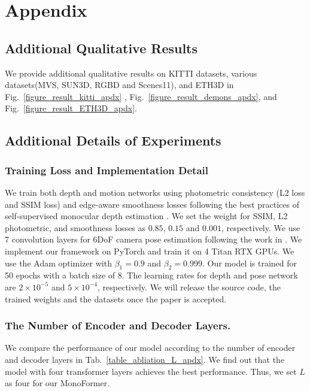 \documentclass[letterpaper]{article} \usepackage{aaai23}  \usepackage{times}  \usepackage{helvet}  \usepackage{courier}  \usepackage[hyphens]{url}  \usepackage{graphicx} \urlstyle{rm} \def\UrlFont{\rm}  \usepackage{natbib}  \usepackage{caption} \frenchspacing  \setlength{\pdfpagewidth}{8.5in} \setlength{\pdfpageheight}{11in} \usepackage{algorithm}
\newcommand{\tabref}[1]{Tab.~\ref{#1}}
\newcommand{\figref}[1]{Fig.~\ref{#1}}
\begin{document}
\appendix



\section{Appendix}

\subsection{Additional Qualitative Results}
We provide additional qualitative results on KITTI datasets, various datasets(MVS, SUN3D, RGBD and Scenes11), and ETH3D in \figref{figure_result_kitti_apdx}
, \figref{figure_result_demons_apdx}, and \figref{figure_result_ETH3D_apdx}.


\subsection{Additional Details of Experiments}

\subsubsection{Training Loss and Implementation Detail}
We train both depth and motion networks using photometric consistency (L2 loss and SSIM loss) and edge-aware smoothness losses following the best practices of self-supervised monocular depth estimation \cite{zhou2017unsupervised,godard2019digging,guizilini20203d}.
We set the weight for SSIM, L2 photometric, and smoothness losses as $0.85$, $0.15$ and $0.001$, respectively. 
We use 7 convolution layers for 6DoF camera pose estimation following the work in \cite{zhou2017unsupervised}.
We implement our framework on PyTorch and train it on 4 Titan RTX GPUs. We use the Adam optimizer \cite{kingma2014adam} with $\beta_1 = 0.9$ and $\beta_2 = 0.999$. Our model is trained for 50 epochs with a batch size of 8. The learning rates for depth and pose network are $2 \times 10^{-5}$ and $5 \times 10^{-4}$, respectively. 
We will release the source code, the trained weights and the datasets once the paper is accepted.

\subsubsection{The Number of Encoder and Decoder Layers.}
We compare the performance of our model according to the number of encoder and decoder layers in \tabref{table_abliation_L_apdx}. 
We find out that the model with four transformer layers achieves the best performance.
Thus, we set $L$ as four for our MonoFormer.
\end{document}
